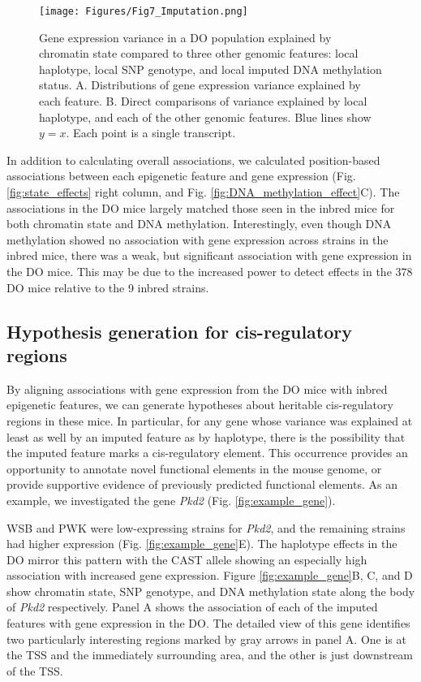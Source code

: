 \documentclass[
  11pt,
]{article}
\begin{document}
\begin{figure}[ht!]
\texttt{[image: Figures/Fig7\_Imputation.png]} 
\caption{Gene expression variance in a DO population explained 
by chromatin state compared to three other genomic features: 
local haplotype, local SNP genotype, and local imputed DNA 
methylation status. A. Distributions of gene expression variance 
explained by each feature. B. Direct comparisons of 
variance explained by local haplotype, and each of the other 
genomic features. Blue lines show $y = x$. Each point is a 
single transcript.}
\label{fig:effect_distrubutions}
\end{figure}

In addition to calculating overall associations, we calculated
position-based associations between each epigenetic feature and gene
expression (Fig. \ref{fig:state_effects} right column, and Fig.
\ref{fig:DNA_methylation_effect}C). The associations in the DO mice
largely matched those seen in the inbred mice for both chromatin state
and DNA methylation. Interestingly, even though DNA methylation showed
no association with gene expression across strains in the inbred mice,
there was a weak, but significant association with gene expression in
the DO mice. This may be due to the increased power to detect effects in
the 378 DO mice relative to the 9 inbred strains.

\hypertarget{hypothesis-generation-for-cis-regulatory-regions}{%
\subsection{Hypothesis generation for cis-regulatory
regions}\label{hypothesis-generation-for-cis-regulatory-regions}}

By aligning associations with gene expression from the DO mice with
inbred epigenetic features, we can generate hypotheses about heritable
cis-regulatory regions in these mice. In particular, for any gene whose
variance was explained at least as well by an imputed feature as by
haplotype, there is the possibility that the imputed feature marks a
cis-regulatory element. This occurrence provides an opportunity to
annotate novel functional elements in the mouse genome, or provide
supportive evidence of previously predicted functional elements. As an
example, we investigated the gene \textit{Pkd2} (Fig.
\ref{fig:example_gene}).

WSB and PWK were low-expressing strains for \textit{Pkd2}, and the
remaining strains had higher expression (Fig. \ref{fig:example_gene}E).
The haplotype effects in the DO mirror this pattern with the CAST allele
showing an especially high association with increased gene expression.
Figure \ref{fig:example_gene}B, C, and D show chromatin state, SNP
genotype, and DNA methylation state along the body of \textit{Pkd2}
respectively. Panel A shows the association of each of the imputed
features with gene expression in the DO. The detailed view of this gene
identifies two particularly interesting regions marked by gray arrows in
panel A. One is at the TSS and the immediately surrounding area, and the
other is just downstream of the TSS.
\end{document}
